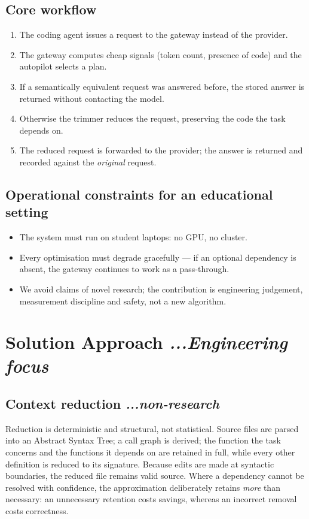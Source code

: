 \documentclass[11pt,a4paper]{article}
\newcommand{\BvrHint}[1]{%
  {\normalfont\normalsize\itshape\hfill #1}}
\begin{document}
\subsection{Core workflow}
\begin{enumerate}[noitemsep]
  \item The coding agent issues a request to the gateway instead of the provider.
  \item The gateway computes cheap signals (token count, presence of code) and
        the autopilot selects a plan.
  \item If a semantically equivalent request was answered before, the stored
        answer is returned without contacting the model.
  \item Otherwise the trimmer reduces the request, preserving the code the task
        depends on.
  \item The reduced request is forwarded to the provider; the answer is returned
        and recorded against the \emph{original} request.
\end{enumerate}

\subsection{Operational constraints for an educational setting}
\begin{itemize}[noitemsep]
  \item The system must run on student laptops: no GPU, no cluster.
  \item Every optimisation must degrade gracefully --- if an optional dependency
        is absent, the gateway continues to work as a pass-through.
  \item We avoid claims of novel research; the contribution is engineering
        judgement, measurement discipline and safety, not a new algorithm.
\end{itemize}

\section{Solution Approach \BvrHint{...Engineering focus}}

\subsection{Context reduction \BvrHint{...non-research}}
Reduction is deterministic and structural, not statistical. Source files are
parsed into an Abstract Syntax Tree; a call graph is derived; the function the
task concerns and the functions it depends on are retained in full, while every
other definition is reduced to its signature. Because edits are made at syntactic
boundaries, the reduced file remains valid source. Where a dependency cannot be
resolved with confidence, the approximation deliberately retains \emph{more} than
necessary: an unnecessary retention costs savings, whereas an incorrect removal
costs correctness.
\end{document}
